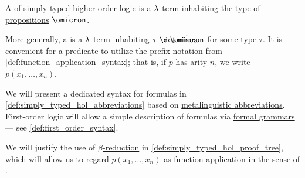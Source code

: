 \begin{definition}\label{def:simply_typed_hol_formula}
  A  of \hyperref[def:simply_typed_hol]{simply typed higher-order logic} is a \( {\mathrm \lambda} \)-term \hyperref[def:type_habitation]{inhabiting} the \hyperref[def:simply_typed_hol_signature/types]{type of propositions} \( \syn\omicron \).

  More generally, a  is a \( {\mathrm \lambda} \)-term inhabiting \( \tau \synimplies \syn\omicron \) for some type \( \tau \). It is convenient for a predicate to utilize the prefix notation from \cref{def:function_application_syntax}; that is, if \( p \) has arity \( n \), we write \( p(x_1, \ldots, x_n) \).
\end{definition}
\begin{comments}
  \item We will present a dedicated syntax for formulas in \cref{def:simply_typed_hol_abbreviations} based on \hyperref[con:metalingual_abbreviation]{metalinguistic abbreviations}. First-order logic will allow a simple description of formulas via \hyperref[def:formal_grammar]{formal grammars} --- see \ref{def:first_order_syntax}.

  \item We will justify the use of \hyperref[def:beta_eta_reduction]{\( \beta \)-reduction} in \cref{def:simply_typed_hol_proof_tree}, which will allow us to regard \( p(x_1, \ldots, x_n) \) as function application in the sense of .
\end{comments}

